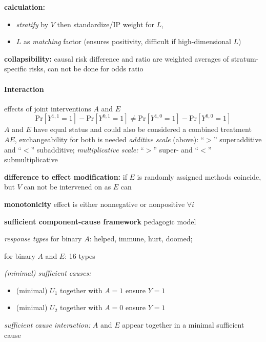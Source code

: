 \documentclass[8pt,twoside]{extarticle}
\begin{document}
\begin{multicols}{2}
 \textbf{calculation:} 
\begin{itemize}[itemsep=0em, topsep=0pt, partopsep=0pt,parsep=0pt, leftmargin=1.5em]
\setlength{\itemsep}{0pt}%
\setlength{\parskip}{0pt}
\item \textit{stratify} by $V$ then standardize/IP weight for $L$, 
\item $L$ as \textit{matching} factor (ensures positivity, difficult if high-dimensional $L$)
\end{itemize}

 \textbf{collapsibility:}  causal risk difference and ratio are weighted averages of stratum-specific risks, can not be done for odds ratio



\paragraph{Interaction} effects of joint interventions $A$ and $E$ 
$$\mathrm{Pr}\left[Y^{1,1}{=}1\right] - \mathrm{Pr}\left[Y^{0,1}{=}1\right] \neq \mathrm{Pr}\left[Y^{1,0}{=}1\right] - \mathrm{Pr}\left[Y^{0,0}{=}1\right]$$
$A$ and $E$ have equal status and could also be considered a combined treatment $AE$, exchangeability for both is needed
\textit{additive scale} (above): ``$>$'' superadditive and ``$<$'' subadditive;
\textit{multiplicative scale:} ``$>$'' super- and ``$<$'' submultiplicative

 \textbf{difference to effect modification:} if $E$ is randomly assigned methods coincide, but $V$ can not be intervened on as $E$ can 

 \textbf{monotonicity} effect is either nonnegative or nonpositive $\forall i$

 \textbf{sufficient component-cause framework} pedagogic model

 \textit{response types} for binary $A$: helped, immune, hurt, doomed;

 for binary $A$ and $E$: 16 types

 \textit{(minimal) sufficient causes: }
\begin{itemize}[itemsep=0em, topsep=0pt, partopsep=0pt,parsep=0pt, leftmargin=1.5em]
\setlength{\itemsep}{0pt}%
\setlength{\parskip}{0pt}
\item (minimal) $U_1$ together with $A=1$ ensure $Y=1$
\item (minimal) $U_2$ together with $A=0$ ensure $Y=1$
\end{itemize}
\textit{sufficient cause interaction:} $A$ and $E$ appear together in a minimal sufficient cause



\end{multicols}
\end{document}
